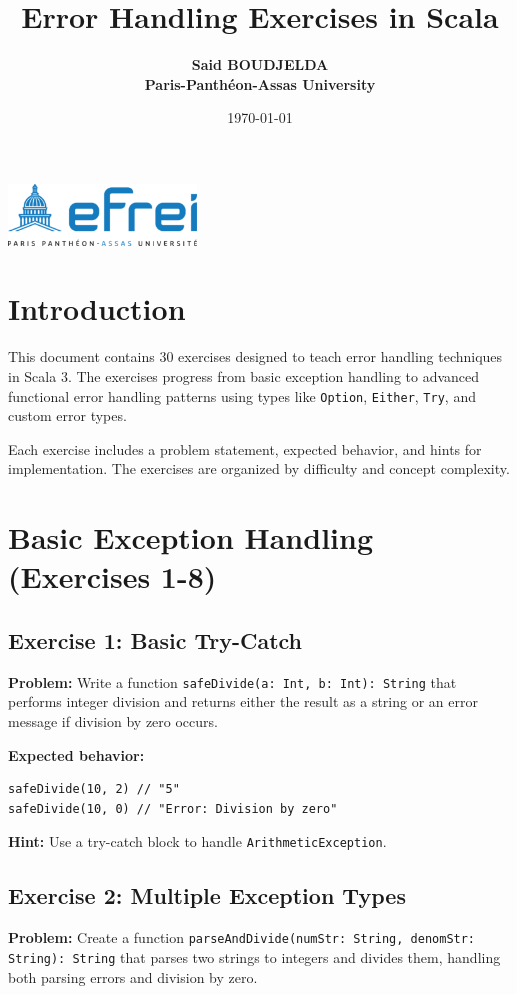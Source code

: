 \documentclass[12pt,a4paper]{article}
\title{\textbf{Error Handling Exercises in Scala}}
\author{\textbf{Said BOUDJELDA}\\ \textbf{Paris-Panthéon-Assas University}}
\date{\today}
\begin{document}
\maketitle

\begin{center}
  \includegraphics[width=5cm]{logo}
\end{center}


\tableofcontents
\newpage

\section{Introduction}

This document contains 30 exercises designed to teach error handling techniques in Scala 3. The exercises progress from basic exception handling to advanced functional error handling patterns using types like \texttt{Option}, \texttt{Either}, \texttt{Try}, and custom error types.

Each exercise includes a problem statement, expected behavior, and hints for implementation. The exercises are organized by difficulty and concept complexity.

\section{Basic Exception Handling (Exercises 1-8)}

\subsection{Exercise 1: Basic Try-Catch}
\textbf{Problem:} Write a function \texttt{safeDivide(a: Int, b: Int): String} that performs integer division and returns either the result as a string or an error message if division by zero occurs.

\textbf{Expected behavior:}
\begin{lstlisting}
safeDivide(10, 2) // "5"
safeDivide(10, 0) // "Error: Division by zero"
\end{lstlisting}

\textbf{Hint:} Use a try-catch block to handle \texttt{ArithmeticException}.

\subsection{Exercise 2: Multiple Exception Types}
\textbf{Problem:} Create a function \texttt{parseAndDivide(numStr: String, denomStr: String): String} that parses two strings to integers and divides them, handling both parsing errors and division by zero.
\end{document}
